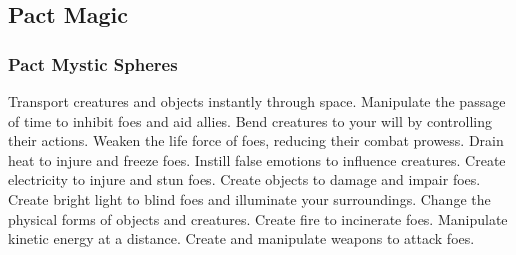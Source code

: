 \small
\subsection{Pact Magic}\label{Pact Magic}
\subsubsection{Pact Mystic Spheres}\label{Pact Mystic Spheres}
\begin{spelllist}
 Transport creatures and objects instantly through space.
 Manipulate the passage of time to inhibit foes and aid allies.
 Bend creatures to your will by controlling their actions.
 Weaken the life force of foes, reducing their combat prowess.
 Drain heat to injure and freeze foes.
 Instill false emotions to influence creatures.
 Create electricity to injure and stun foes.
 Create objects to damage and impair foes.
 Create bright light to blind foes and illuminate your surroundings.
 Change the physical forms of objects and creatures.
 Create fire to incinerate foes.
 Manipulate kinetic energy at a distance.
 Create and manipulate weapons to attack foes.
\end{spelllist}
